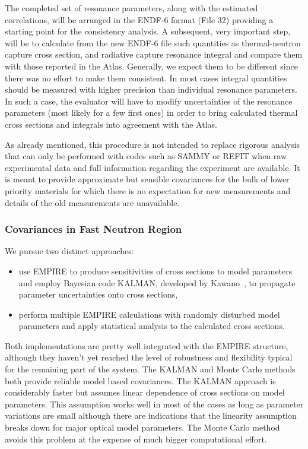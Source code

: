 \documentclass[twocolumn,amsmath,amssymb,10pt,groupedaddress,letter]{revtex4}
\begin{document}
The completed set of resonance parameters, along with the estimated correlations, will be arranged in the ENDF-6 format (File 32) providing a starting point for the consistency analysis. A subsequent, very important step, will be to calculate from the new ENDF-6 file such quantities as thermal-neutron capture cross section, and radiative capture resonance integral and compare them with those reported in the Atlas. Generally, we expect them to be different since there was no effort to make them consistent. In most cases integral quantities should be measured with higher precision than individual resonance parameters. In such a case, the evaluator will have to modify uncertainties of the resonance parameters (most likely for a few first ones) in order to bring calculated thermal cross sections and integrals into agreement with the Atlas.

As already mentioned, this procedure is not intended to replace rigorous analysis that can only be performed with codes such as SAMMY or REFIT when raw experimental data and full information regarding the experiment are available. It is meant to provide approximate but sensible covariances for the bulk of lower priority materials for which there is no expectation for new measurements and details of the old measurements are unavailable.



\subsubsection{Covariances in Fast Neutron Region}
We pursue two distinct approaches:
\begin{itemize}
\item use EMPIRE to produce sensitivities of cross sections to model parameters and employ Bayesian code KALMAN, developed by Kawano~\cite{Kawano:97}, to propagate parameter uncertainties onto cross sections,
\item perform multiple EMPIRE calculations with randomly disturbed model parameters and apply statistical analysis to the calculated cross sections.
\end{itemize}

Both implementations are pretty well integrated with the EMPIRE structure, although they haven't yet reached the level of robustness and flexibility typical for the remaining part of the system. The KALMAN and Monte Carlo methods both provide reliable model based covariances. The KALMAN approach is considerably faster but assumes linear dependence of cross sections on model parameters. This assumption works well in most of the cases as long as parameter variations are small although there are indications that the linearity assumption breaks down for major optical model parameters.  The Monte Carlo method avoids this problem at the expense of much bigger computational effort.
\end{document}
